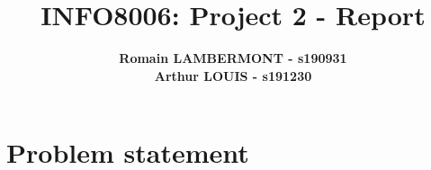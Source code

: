 \documentclass{article}
\begin{document}

\title{\Large{INFO8006: Project 2 - Report}}
\vspace{1cm}
\author{\small{\bf Romain LAMBERMONT - s190931} \\ \small{\bf Arthur LOUIS - s191230}}

\maketitle


\section{Problem statement}
\end{document}
